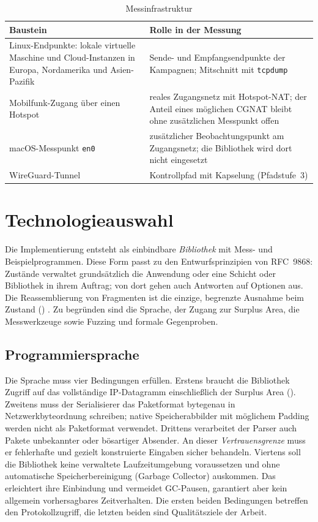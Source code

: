 \begin{table}[H]
  \centering
  \caption{Messinfrastruktur}
  \label{tab:scope-messung}
  \small
  \begin{tabularx}{\textwidth}{@{}L{5.4cm}Y@{}}
    \toprule
    \textbf{Baustein} & \textbf{Rolle in der Messung} \\
    \midrule
    Linux-Endpunkte: lokale virtuelle Maschine und Cloud-Instanzen in Europa, Nordamerika
      und Asien-Pazifik & Sende- und Empfangsendpunkte der Kampagnen; Mitschnitt mit \texttt{tcpdump} \\
    Mobilfunk-Zugang über einen Hotspot & reales Zugangsnetz mit Hotspot-NAT; der Anteil eines
      möglichen CGNAT bleibt ohne zusätzlichen Messpunkt offen \\
    macOS-Messpunkt \texttt{en0} & zusätzlicher Beobachtungspunkt am Zugangsnetz;
      die Bibliothek wird dort nicht eingesetzt \\
    WireGuard-Tunnel & Kontrollpfad mit Kapselung (Pfadstufe~3) \\
    \bottomrule
  \end{tabularx}
\end{table}

\section{Technologieauswahl}
\label{sec:technologieauswahl}

Die Implementierung entsteht als einbindbare \textit{Bibliothek} mit Mess- und Beispiel\-programmen.
Diese Form passt zu den Entwurfsprinzipien von RFC~9868: Zustände verwaltet grundsätzlich die Anwendung
oder eine Schicht oder Bibliothek in ihrem Auftrag; von dort gehen auch Antworten auf Optionen aus. Die
Reassemblierung von Fragmenten ist die einzige, begrenzte Ausnahme beim Zustand
() \cite[Sec.~6]{rfc9868}. Zu begründen sind die Sprache, der Zugang
zur Surplus Area, die Messwerkzeuge sowie Fuzzing und formale Gegenproben.

\subsection{Programmiersprache}
\label{subsec:programmiersprache}

Die Sprache muss vier Bedingungen erfüllen. Erstens braucht die Bibliothek Zugriff auf das vollständige IP-Datagramm
einschließlich der Surplus Area (). Zweitens muss der Serialisierer das Paketformat bytegenau in
Netzwerkbyteordnung schreiben; native Speicherabbilder mit möglichem Padding werden nicht als Paketformat verwendet.
Drittens verarbeitet der Parser auch Pakete unbekannter oder bösartiger Absender. An dieser \textit{Vertrauensgrenze}
muss er fehlerhafte und gezielt konstruierte Eingaben sicher behandeln. Viertens soll die Bibliothek keine verwaltete
Laufzeitumgebung voraussetzen und ohne automatische Speicher\-bereinigung (\mbox{Garbage} Collector) auskommen. Das
erleichtert ihre Einbindung und vermeidet GC-Pausen, garantiert aber kein allgemein vorhersagbares Zeitverhalten. Die
ersten beiden Bedingungen betreffen den Protokollzugriff, die letzten beiden sind Qualitätsziele der Arbeit.

